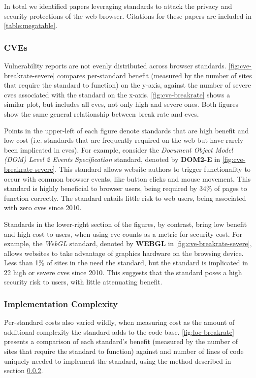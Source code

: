 In total we identified \NumAttackPapers papers leveraging \NumAttackStandards
standards to attack the privacy and security protections of the web browser.
Citations for these papers are included in \ref{table:megatable}.


\subsubsection{CVEs}
\label{cost-benefit:results:costs-cves}


Vulnerability reports are not evenly distributed across browser standards.
\ref{fig:cve-breakrate-severe} compares per-standard
benefit (measured by the number of sites that require the standard to function)
on the y-axis, against the number of severe \gls{cve}s associated with the
standard on the x-axis.  \ref{fig:cve-breakrate} shows a similar plot, but
includes all \gls{cve}s, not only high and severe ones.  Both figures
show the same general relationship between break rate and \gls{cve}s.

Points in the upper-left of each figure denote standards that are high benefit
and low cost  (i.e. standards that are frequently required on the web but have
rarely been implicated in \gls{cve}s).  For example, consider the
\textit{Document Object Model (DOM) Level 2 Events Specification} standard,
denoted by \textbf{DOM2-E} in \ref{fig:cve-breakrate-severe}.  This
standard allows website authors to trigger functionality to occur with
common browser events, like button clicks and mouse movement.  This standard is highly
beneficial to browser users, being required by 34\% of pages to function
correctly.  The standard entails little risk to web users, being
associated with zero \gls{cve}s since 2010.

Standards in the lower-right section of the figures, by contrast, bring
low benefit and high cost to users, when using \gls{cve} counts as a metric
for security cost.  For example, the \textit{WebGL} standard, denoted by
\textbf{WEBGL} in \ref{fig:cve-breakrate-severe}, allows websites to take
advantage of graphics hardware on the browsing device.
Less than 1\% of sites in the \ATK need the standard, but
the standard is implicated in 22 high or severe \gls{cve}s since 2010.  This
suggests that the standard poses a high security risk to users, with
little attenuating benefit.


\subsubsection{Implementation Complexity}
\label{cost-benefit:results:costs-loc}

Per-standard costs also varied wildly, when measuring cost as the amount of
additional complexity the standard adds to the code base.
\ref{fig:loc-breakrate} presents a comparison of each standard's benefit
(measured by the number of sites that require the standard to function) against
and number of lines of code uniquely needed to implement the standard,
using the method described in section \ref{cost-benefit:results:costs-loc}.

